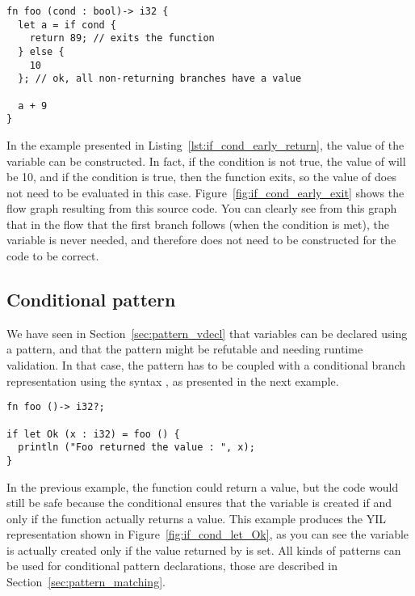 

\begin{lstlisting}[style=coloredverbatim, caption=Early return in \token{if} condition, label=lst:if_cond_early_return]
fn foo (cond : bool)-> i32 {
  let a = if cond {
    return 89; // exits the function
  } else {
    10
  }; // ok, all non-returning branches have a value

  a + 9
}
\end{lstlisting}

In the example presented in Listing~\ref{lst:if_cond_early_return}, the value of
the variable  can be constructed. In fact, if the condition is not
true, the value of  will be 10, and if the condition is true, then the
function exits, so the value of  does not need to be evaluated in this
case. Figure~\ref{fig:if_cond_early_exit} shows the flow graph resulting from
this source code. You can clearly see from this graph that in the flow that the
first branch follows (when the condition is met), the variable  is
never needed, and therefore does not need to be constructed for the code to be
correct.


\subsection {Conditional pattern}
\label{sec:cond_pattern}

We have seen in Section~\ref{sec:pattern_vdecl} that variables can be declared
using a pattern, and that the pattern might be refutable and needing runtime
validation. In that case, the pattern has to be coupled with a conditional
branch representation using the syntax , as
presented in the next example.



\begin{lstlisting}[style=coloredverbatim, label=lst:if_cond_let_Ok, caption=Example of conditional pattern]
fn foo ()-> i32?;

if let Ok (x : i32) = foo () {
  println ("Foo returned the value : ", x);
}
\end{lstlisting}

In the previous example, the function  could return a 
value, but the code would still be safe because the conditional ensures that the
variable  is created if and only if the function actually returns a
value. This example produces the YIL representation shown in
Figure~\ref{fig:if_cond_let_Ok}, as you can see the variable  is
actually created only if the value returned by  is set. All kinds of
patterns can be used for conditional pattern declarations, those are described
in Section~\ref{sec:pattern_matching}.


